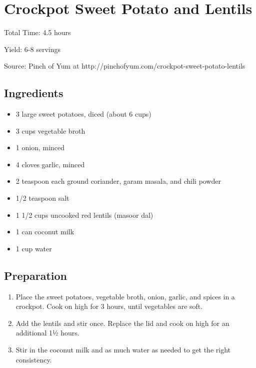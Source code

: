 \section{Crockpot Sweet Potato and Lentils}

\begin{center}
\noindent Total Time: 4.5 hours

\noindent Yield: 6-8 servings

\vspace{1em}

Source: Pinch of Yum at http://pinchofyum.com/crockpot-sweet-potato-lentils
\end{center}

\subsection{Ingredients}
\begin{multicols}{2}
\begin{itemize}
    \item 3 large sweet potatoes, diced (about 6 cups)
    \item 3 cups vegetable broth
    \item 1 onion, minced
    \item 4 cloves garlic, minced
    \item 2 teaspoon each ground coriander, garam masala, and chili powder
    \item 1/2 teaspoon salt
    \item 1 1/2 cups uncooked red lentils (masoor dal)
    \item 1 can coconut milk
    \item 1 cup water
\end{itemize}
\end{multicols}

\subsection{Preparation}
\begin{enumerate}
    \item Place the sweet potatoes, vegetable broth, onion, garlic, and spices in a crockpot. Cook on high for 3 hours, until vegetables are soft.
    \item Add the lentils and stir once. Replace the lid and cook on high for an additional 1½ hours.
    \item Stir in the coconut milk and as much water as needed to get the right consistency.
\end{enumerate}
